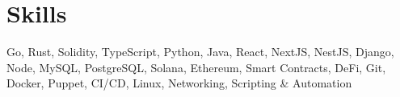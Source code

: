
\section{Skills}

\begin{itemize}[leftmargin=0.15in, label={}]

\small{\item{{Go, Rust, Solidity, TypeScript, Python, Java, React, NextJS, NestJS, Django, Node, MySQL, PostgreSQL, Solana, Ethereum, Smart Contracts, DeFi, Git, Docker, Puppet, CI/CD, Linux, Networking, Scripting \& Automation} \\
}}

\end{itemize}